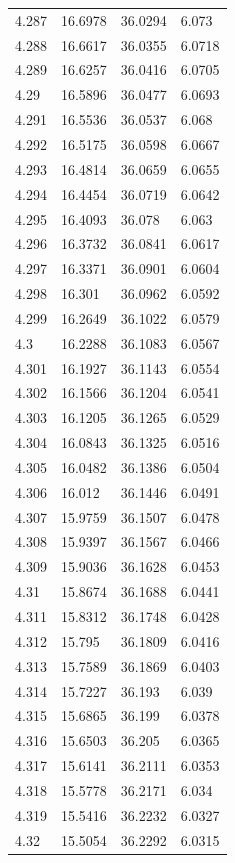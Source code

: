 \begin{tabular}{llll}
4.287 & 16.6978 & 36.0294 & 6.073 \\
4.288 & 16.6617 & 36.0355 & 6.0718 \\
4.289 & 16.6257 & 36.0416 & 6.0705 \\
4.29 & 16.5896 & 36.0477 & 6.0693 \\
4.291 & 16.5536 & 36.0537 & 6.068 \\
4.292 & 16.5175 & 36.0598 & 6.0667 \\
4.293 & 16.4814 & 36.0659 & 6.0655 \\
4.294 & 16.4454 & 36.0719 & 6.0642 \\
4.295 & 16.4093 & 36.078 & 6.063 \\
4.296 & 16.3732 & 36.0841 & 6.0617 \\
4.297 & 16.3371 & 36.0901 & 6.0604 \\
4.298 & 16.301 & 36.0962 & 6.0592 \\
4.299 & 16.2649 & 36.1022 & 6.0579 \\
4.3 & 16.2288 & 36.1083 & 6.0567 \\
4.301 & 16.1927 & 36.1143 & 6.0554 \\
4.302 & 16.1566 & 36.1204 & 6.0541 \\
4.303 & 16.1205 & 36.1265 & 6.0529 \\
4.304 & 16.0843 & 36.1325 & 6.0516 \\
4.305 & 16.0482 & 36.1386 & 6.0504 \\
4.306 & 16.012 & 36.1446 & 6.0491 \\
4.307 & 15.9759 & 36.1507 & 6.0478 \\
4.308 & 15.9397 & 36.1567 & 6.0466 \\
4.309 & 15.9036 & 36.1628 & 6.0453 \\
4.31 & 15.8674 & 36.1688 & 6.0441 \\
4.311 & 15.8312 & 36.1748 & 6.0428 \\
4.312 & 15.795 & 36.1809 & 6.0416 \\
4.313 & 15.7589 & 36.1869 & 6.0403 \\
4.314 & 15.7227 & 36.193 & 6.039 \\
4.315 & 15.6865 & 36.199 & 6.0378 \\
4.316 & 15.6503 & 36.205 & 6.0365 \\
4.317 & 15.6141 & 36.2111 & 6.0353 \\
4.318 & 15.5778 & 36.2171 & 6.034 \\
4.319 & 15.5416 & 36.2232 & 6.0327 \\
4.32 & 15.5054 & 36.2292 & 6.0315 \\

\end{tabular}
